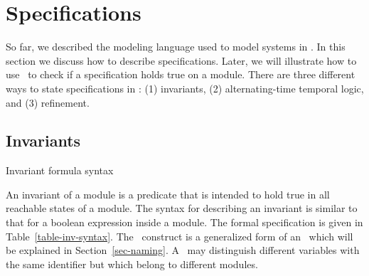 \chapter{Specifications}
\label{chap:specs}
\label{sec:specs}

So far, we described the modeling language used to model systems in \mocha.
In this section we discuss how to describe specifications. Later, we will
illustrate how to use \mocha\ to check if a specification holds
true on a module. There are three different ways to state
specifications in \mocha: (1) invariants, (2) alternating-time temporal logic, and (3) refinement.

\section{Invariants}
\label{subsec:invariant}

\begin{table}
\caption{Invariant formula syntax}
\label{table-inv-syntax}
\end{table}

An invariant of a module is a predicate that is intended to hold true
in all reachable states of a module. The syntax for describing an
invariant is similar to that for a boolean expression inside a module.
The formal specification is given in Table~\ref{table-inv-syntax}.
The \fullident\ construct is a generalized form of an \ident\
which will be explained in Section~\ref{sec-naming}.
A \fullident\ may distinguish different variables with the same identifier
but which belong to different modules.

